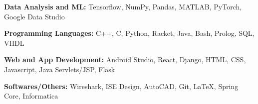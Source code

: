 \begin{cventries}
  \cventry
    {}
    {}
    {}
    {}
    {
    \vspace{-0.4cm}
      \begin{cvitems}
        \item{\textbf{Data Analysis and ML:} \hspace{14.5mm}  Tensorflow, NumPy, Pandas, MATLAB, PyTorch, Google Data Studio}
        \vspace{0.35mm}
        \item {\textbf{Programming Languages:} \hspace{0.9cm} C++, C, Python, Racket, Java, Bash, Prolog, SQL, VHDL}
        \vspace{0.35mm}
        \item{\textbf{Web and App Development:} \hspace{4mm} Android Studio, React, Django, HTML, CSS, Javascript, Java Servlets/JSP, Flask}
        \vspace{0.35mm}
        \item{\textbf{Softwares/Others:}  \hspace{2cm}  Wireshark, ISE Design, AutoCAD, Git, \LaTeX, Spring Core, Informatica} \vspace{-1mm}
      \end{cvitems}
    }
\end{cventries}